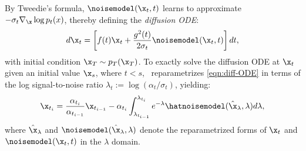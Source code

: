 By Tweedie's formula, $\noisemodel(\x_t,t)$ learns to approximate $-\sigma_t\nabla_\x\log p_t(x)$, thereby defining the \emph{diffusion ODE}:
\begin{equation}
    \label{eqn:diff-ODE}
    d\x_t = \left[f(t)\x_t + \frac{g^2(t)}{2\sigma_t}\noisemodel(\x_t,t)\right]dt,
\end{equation}
with initial condition $\x_T\sim p_T(\x_T)$.
To exactly solve the diffusion ODE at $\x_t$ given an initial value $\x_s$, where $ t<s$,~\citet{lu2022dpm} reparametrizes \eqref{eqn:diff-ODE} in terms of the log signal-to-noise ratio $\lambda_t := \log(\alpha_t/\sigma_t)$, yielding:
\begin{equation}
\label{eqn:lambda-exact-soln}
\x_{t_i}=\frac{\alpha_{t_i}}{\alpha_{t_{i-1}}}\x_{t_{i-1}} - \alpha_{t_i}\int_{\lambda_{t_{i-1}}}^{\lambda_{t_i}} e^{-\lambda} \hatnoisemodel(\hat\x_\lambda,\lambda)d\lambda,
\end{equation}
where $\hat\x_\lambda$ and $\noisemodel(\hat\x_\lambda,\lambda)$ denote the reparametrized forms of $\x_t$ and $\noisemodel(\x_t,t)$ in the $\lambda$ domain.

